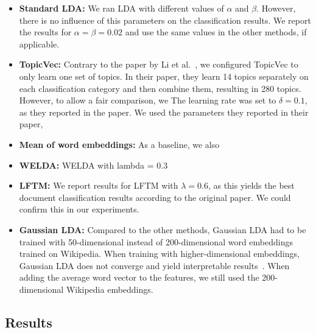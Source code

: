 \documentclass[
        a4paper,
        titlepage,
        twoside,
        parskip
        ]{scrbook}
\theoremstyle{break}
\begin{document}
\begin{itemize}
  \item
    \textbf{Standard LDA:}
    We ran LDA with different values of $\alpha$ and $\beta$.
    However, there is no influence of this parameters on the classification results.
    We report the results for $\alpha = \beta = 0.02$ and use the same values in the other methods, if applicable.
  \item
    \textbf{TopicVec:}
    Contrary to the paper by Li et al.~\cite{Li2016}, we configured TopicVec to only learn one set of topics.
    In their paper, they learn 14 topics separately on each classification category and then combine them, resulting in 280 topics.
    However, to allow a fair comparison, we 
    The learning rate was set to $\delta = 0.1$, as they reported in the paper.
    We used the parameters they reported in their paper, 
  \item
    \textbf{Mean of word embeddings:}
    As a baseline, we also 
  \item
    \textbf{WELDA:}
    WELDA with lambda = 0.3
  \item
    \textbf{LFTM:}
    We report results for LFTM with $\lambda = 0.6$, as this yields the best document classification results according to the original paper.
    We could confirm this in our experiments.
  \item
    \textbf{Gaussian LDA:}
    Compared to the other methods, Gaussian LDA had to be trained with 50-dimensional instead of 200-dimensional word embeddings trained on Wikipedia.
    When training with higher-dimensional embeddings, Gaussian LDA does not converge and yield interpretable results~\cite{Das2016}.
    When adding the average word vector to the features, we still used the 200-dimensional Wikipedia embeddings.
\end{itemize}


\subsection{Results}
\end{document}
